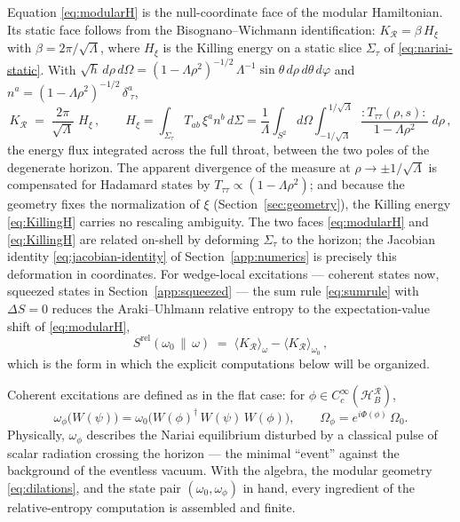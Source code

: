 \documentclass[11pt]{article}
\newcommand{\Srel}{S^{\mathrm{rel}}}
\newcommand{\Nariai}{Nariai}
\begin{document}
Equation \eqref{eq:modularH} is the null-coordinate face of the modular Hamiltonian. Its static face follows from the Bisognano--Wichmann identification: $K_{\mathcal{R}} = \beta\, H_\xi$ with $\beta = 2\pi/\sqrt{\Lambda}$, where $H_\xi$ is the Killing energy on a static slice $\Sigma_\tau$ of \eqref{eq:nariai-static}. With $\sqrt{h}\, d\rho\, d\Omega = (1-\Lambda\rho^2)^{-1/2}\, \Lambda^{-1} \sin\theta\, d\rho\, d\theta\, d\varphi$ and $n^a = (1-\Lambda\rho^2)^{-1/2}\, \delta^a_{\;\tau}$,
\begin{equation}
K_{\mathcal{R}} \;=\; \frac{2\pi}{\sqrt{\Lambda}}\; H_\xi\,,
\qquad
H_\xi
= \int_{\Sigma_\tau} T_{ab}\, \xi^a n^b\, d\Sigma
= \frac{1}{\Lambda} \int_{S^2} d\Omega \int_{-1/\sqrt{\Lambda}}^{\,1/\sqrt{\Lambda}}
\frac{{:}T_{\tau\tau}(\rho, s){:}}{1 - \Lambda \rho^2}\; d\rho\,,
\label{eq:KillingH}
\end{equation}
the energy flux integrated across the full throat, between the two poles of the degenerate horizon. The apparent divergence of the measure at $\rho \to \pm 1/\sqrt{\Lambda}$ is compensated for Hadamard states by $T_{\tau\tau} \propto (1-\Lambda\rho^2)$; and because the geometry fixes the normalization of $\xi$ (Section~\ref{sec:geometry}), the Killing energy \eqref{eq:KillingH} carries no rescaling ambiguity. The two faces \eqref{eq:modularH} and \eqref{eq:KillingH} are related on-shell by deforming $\Sigma_\tau$ to the horizon; the Jacobian identity \eqref{eq:jacobian-identity} of Section~\ref{app:numerics} is precisely this deformation in coordinates. For wedge-local excitations --- coherent states now, squeezed states in Section~\ref{app:squeezed} --- the sum rule \eqref{eq:sumrule} with $\Delta S = 0$ reduces the Araki--Uhlmann relative entropy to the expectation-value shift of \eqref{eq:modularH},
\begin{equation}
\Srel(\omega_0\,\|\,\omega) \;=\; \langle K_{\mathcal{R}} \rangle_{\omega} - \langle K_{\mathcal{R}} \rangle_{\omega_0}\,,
\label{eq:Srel-K}
\end{equation}
which is the form in which the explicit computations below will be organized.

Coherent excitations are defined as in the flat case: for $\phi \in C_c^\infty(\mathcal{H}_B^{\mathcal{R}})$,
\begin{equation}
\omega_\phi\big(W(\psi)\big) = \omega_0\big(W(\phi)^\dagger\, W(\psi)\, W(\phi)\big),
\qquad
\Omega_\phi = e^{i\Phi(\phi)}\,\Omega_0 .
\label{eq:coherent}
\end{equation}
Physically, $\omega_\phi$ describes the \Nariai{} equilibrium disturbed by a classical pulse of scalar radiation crossing the horizon --- the minimal ``event'' against the background of the eventless vacuum. With the algebra, the modular geometry \eqref{eq:dilations}, and the state pair $(\omega_0, \omega_\phi)$ in hand, every ingredient of the relative-entropy computation is assembled and finite.
\end{document}
